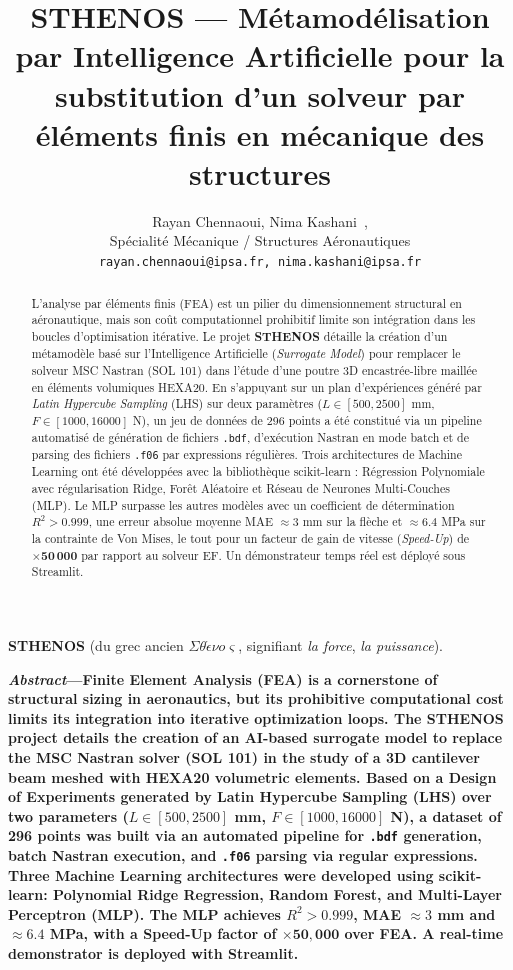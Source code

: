 \documentclass[journal, a4paper, twocolumn]{IEEEtran}
\title{\textbf{STHENOS} --- Métamodélisation par Intelligence Artificielle pour la substitution d'un solveur par éléments finis en mécanique des structures}
\author{Rayan Chennaoui, Nima Kashani~\IEEEmembership{Étudiants IPSA 4A},\\
        Spécialité Mécanique / Structures Aéronautiques\\
        \texttt{rayan.chennaoui@ipsa.fr, nima.kashani@ipsa.fr}}
\begin{document}
\maketitle

\noindent\textbf{STHENOS} (du grec ancien $\Sigma\theta\acute{\epsilon}\nu o\varsigma$, signifiant \textit{la force}, \textit{la puissance}).

\begin{abstract}
L'analyse par éléments finis (FEA) est un pilier du dimensionnement structural en aéronautique, mais son coût computationnel prohibitif limite son intégration dans les boucles d'optimisation itérative. Le projet \textbf{STHENOS} détaille la création d'un métamodèle basé sur l'Intelligence Artificielle (\textit{Surrogate Model}) pour remplacer le solveur MSC Nastran (SOL 101) dans l'étude d'une poutre 3D encastrée-libre maillée en éléments volumiques HEXA20. En s'appuyant sur un plan d'expériences généré par \textit{Latin Hypercube Sampling} (LHS) sur deux paramètres ($L \in [500,2500]$ mm, $F \in [1000,16000]$ N), un jeu de données de 296 points a été constitué via un pipeline automatisé de génération de fichiers \texttt{.bdf}, d'exécution Nastran en mode batch et de parsing des fichiers \texttt{.f06} par expressions régulières. Trois architectures de Machine Learning ont été développées avec la bibliothèque scikit-learn : Régression Polynomiale avec régularisation Ridge, Forêt Aléatoire et Réseau de Neurones Multi-Couches (MLP). Le MLP surpasse les autres modèles avec un coefficient de détermination $R^2 > 0.999$, une erreur absolue moyenne MAE $\approx 3$ mm sur la flèche et $\approx 6.4$ MPa sur la contrainte de Von Mises, le tout pour un facteur de gain de vitesse (\textit{Speed-Up}) de $\mathbf{\times 50\,000}$ par rapport au solveur EF. Un démonstrateur temps réel est déployé sous Streamlit.
\end{abstract}

\textbf{\textit{Abstract}---Finite Element Analysis (FEA) is a cornerstone of structural sizing in aeronautics, but its prohibitive computational cost limits its integration into iterative optimization loops. The \textbf{STHENOS} project details the creation of an AI-based surrogate model to replace the MSC Nastran solver (SOL 101) in the study of a 3D cantilever beam meshed with HEXA20 volumetric elements. Based on a Design of Experiments generated by Latin Hypercube Sampling (LHS) over two parameters ($L \in [500,2500]$ mm, $F \in [1000,16000]$ N), a dataset of 296 points was built via an automated pipeline for \texttt{.bdf} generation, batch Nastran execution, and \texttt{.f06} parsing via regular expressions. Three Machine Learning architectures were developed using scikit-learn: Polynomial Ridge Regression, Random Forest, and Multi-Layer Perceptron (MLP). The MLP achieves $R^2 > 0.999$, MAE $\approx 3$ mm and $\approx 6.4$ MPa, with a Speed-Up factor of $\mathbf{\times 50,000}$ over FEA. A real-time demonstrator is deployed with Streamlit.}
\end{document}
